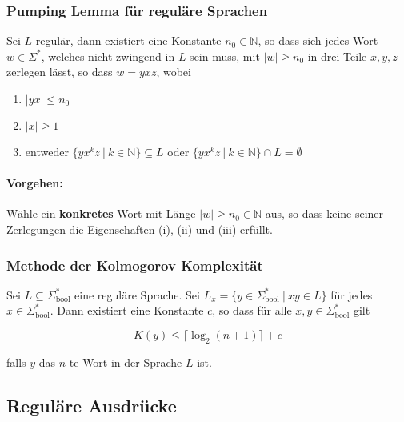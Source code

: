 \documentclass[11pt]{article}
\begin{document}
\subsubsection{Pumping Lemma f{\"u}r regul{\"a}re Sprachen}

Sei $L$ regul{\"a}r, dann existiert eine Konstante $n_0 \in \mathbb{N}$, so dass sich jedes Wort $w \in \Sigma^*$, welches nicht zwingend in $L$ sein muss, mit $|w| \geq n_0$ in drei Teile $x, y, z$ zerlegen l{\"a}sst, so dass $w = yxz$, wobei

\begin{enumerate}[label=(\roman*), noitemsep]
	\item $|yx| \leq n_0$
	\item $|x| \geq 1$
	\item entweder $\{yx^kz\ |\ k \in \mathbb{N}\} \subseteq L$ oder $\{yx^kz\ |\ k \in \mathbb{N}\} \cap L = \emptyset$
\end{enumerate}

\paragraph{Vorgehen:} W{\"a}hle ein \textbf{konkretes} Wort mit L{\"a}nge $|w| \geq n_0 \in \mathbb{N}$ aus, so dass keine seiner Zerlegungen die Eigenschaften (i), (ii) und (iii) erf{\"u}llt.

\subsubsection{Methode der Kolmogorov Komplexit{\"a}t}

Sei $L \subseteq \Sigma_\text{bool}^*$ eine regul{\"a}re Sprache. Sei $L_x = \{y \in \Sigma_\text{bool}^*\ |\ xy \in L\}$ f{\"u}r jedes $x \in \Sigma_\text{bool}^*$. Dann existiert eine Konstante $c$, so dass f{\"u}r alle $x,y \in \Sigma_\text{bool}^*$ gilt

\begin{equation*}
	K(y) \leq \lceil\log_2(n+1)\rceil + c
\end{equation*}

falls $y$ das $n$-te Wort in der Sprache $L$ ist.

\subsection{Regul{\"a}re Ausdr{\"u}cke}
\end{document}
